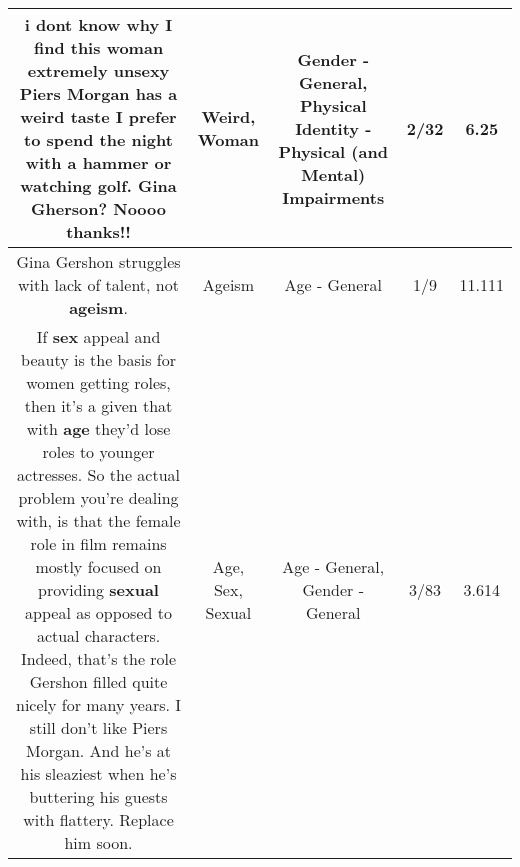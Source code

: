 \documentclass[11pt]{article}
\newlength\mylength
\begin{document}
\begin{center}
\begin{longtable}{|C{.65\mylength}|C{.30\mylength}|C{.12\mylength}|C{.12\mylength}|C{.12\mylength}|}
  \small i dont know why I find this \textbf{woman} extremely unsexy
Piers Morgan has a \textbf{weird} taste
I prefer to spend the night with a hammer or watching golf. Gina Gherson? Noooo thanks!!\normalsize   & Weird, Woman & Gender - General, Physical Identity - Physical (and Mental) Impairments & 2/32 & 6.25 \\  \hline
  \small Gina Gershon struggles with lack of talent, not \textbf{ageism}.\normalsize   & Ageism & Age - General & 1/9 & 11.111 \\  \hline
  \small If \textbf{sex} appeal and beauty is the basis for women getting roles, then it's a given that with \textbf{age} they'd lose roles to younger actresses. So the actual problem you're dealing with, is that the female role in film remains mostly focused on providing \textbf{sexual} appeal as opposed to actual characters. Indeed, that's the role Gershon filled quite nicely for many years. I still don't like Piers Morgan. And he's at his sleaziest when he's buttering his guests with flattery. Replace him soon.\normalsize   & Age, Sex, Sexual & Age - General, Gender - General & 3/83 & 3.614 \\  \hline
  
\end{longtable}
\end{center}
\end{document}
